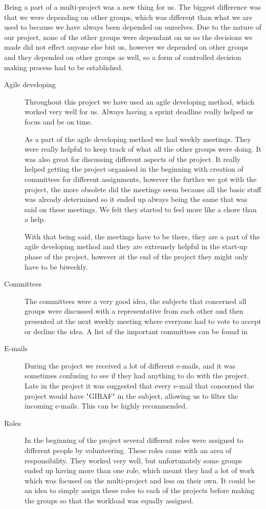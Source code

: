Being a part of a multi-project was a new thing for us. The biggest difference was that we were depending on other groups, which was different than what we are used to because we have always been depended on ourselves. Due to the nature of our project, none of the other groups were dependant on us so the decisions we made did not effect anyone else but us, however we depended on other groups and they depended on other groups as well, so a form of controlled decision making process had to be established. 

\begin{description}
\item[Agile developing] Throughout this project we have used an agile developing method, which worked very well for us. Always having a sprint deadline really helped us focus and be on time. 

As a part of the agile developing method we had weekly meetings. They were really helpful to keep track of what all the other groups were doing. It was also great for discussing different aspects of the project. It really helped getting the project organised in the beginning with creation of committees for different assignments, however the further we got with the project, the more obsolete did the meetings seem because all the basic stuff was already determined so it ended up always being the same that was said on these meetings. We felt they started to feel more like a chore than a help. 

With that being said, the meetings have to be there, they are a part of the agile developing method and they are extremely helpful in the start-up phase of the project, however at the end of the project they might only have to be biweekly. 

\item[Committees] The committees were a very good idea, the subjects that concerned all groups were discussed with a representative from each other and then presented at the next weekly meeting where everyone had to vote to accept or decline the idea. A list of the important committees can be found in 

\item[E-mails] During the project we received a lot of different e-mails, and it was sometimes confusing to see if they had anything to do with the project. Late in the project it was suggested that every e-mail that concerned the project would have "GIRAF" in the subject, allowing us to filter the incoming e-mails. This can be highly recommended. 

\item[Roles] In the beginning of the project several different roles were assigned to different people by volunteering. These roles came with an area of responsibility. They worked very well, but unfortunately some groups ended up having more than one role, which meant they had a lot of work which was focused on the multi-project and less on their own. It could be an idea to simply assign these roles to each of the projects before making the groups so that the workload was equally assigned. 
\end{description}

